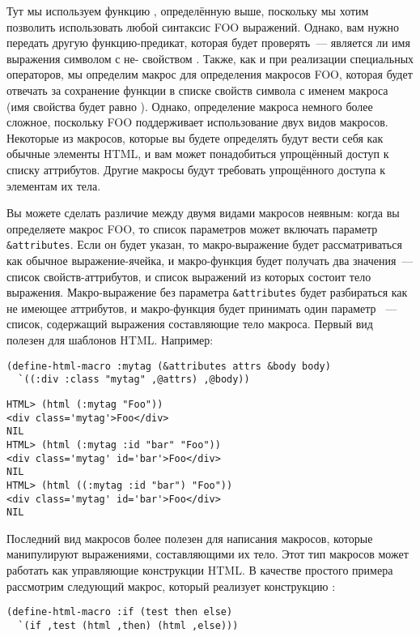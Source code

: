 Тут мы используем функцию , определённую выше, поскольку мы хотим
позволить использовать любой синтаксис FOO выражений.  Однако, вам нужно передать другую
функцию-предикат, которая будет проверять~--- является ли имя выражения символом с
не- свойством .  Также, как и при реализации специальных
операторов, мы определим макрос для определения макросов FOO, которая будет отвечать за
сохранение функции в списке свойств символа с именем макроса (имя свойства будет равно
).  Однако, определение макроса немного более сложное, поскольку FOO
поддерживает использование двух видов макросов. Некоторые из макросов, которые вы будете
определять будут вести себя как обычные элементы HTML, и вам может понадобиться упрощённый
доступ к списку аттрибутов.  Другие макросы будут требовать упрощённого доступа к
элементам их тела.

Вы можете сделать различие между двумя видами макросов неявным: когда вы определяете
макрос FOO, то список параметров может включать параметр \lstinline!&attributes!.  Если он
будет указан, то макро-выражение будет рассматриваться как обычное выражение-ячейка, и
макро-функция будет получать два значения~--- список свойств-аттрибутов, и список выражений
из которых состоит тело выражения.  Макро-выражение без параметра \lstinline!&attributes!
будет разбираться как не имеющее аттрибутов, и макро-функция будет принимать один параметр
~--- список, содержащий выражения составляющие тело макроса.  Первый вид полезен для
шаблонов HTML. Например:

\begin{lstlisting}
(define-html-macro :mytag (&attributes attrs &body body)
  `((:div :class "mytag" ,@attrs) ,@body))
\end{lstlisting}

\begin{verbatim}
HTML> (html (:mytag "Foo"))
<div class='mytag'>Foo</div>
NIL
HTML> (html (:mytag :id "bar" "Foo"))
<div class='mytag' id='bar'>Foo</div>
NIL
HTML> (html ((:mytag :id "bar") "Foo"))
<div class='mytag' id='bar'>Foo</div>
NIL
\end{verbatim}

Последний вид макросов более полезен для написания макросов, которые манипулируют
выражениями, составляющими их тело.  Этот тип макросов может работать как управляющие
конструкции HTML. В качестве простого примера рассмотрим следующий макрос, который
реализует конструкцию :

\begin{lstlisting}
(define-html-macro :if (test then else)
  `(if ,test (html ,then) (html ,else)))
\end{lstlisting}

